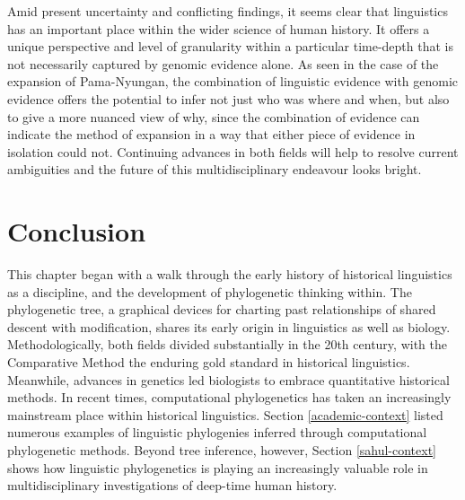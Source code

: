 Amid present uncertainty and conflicting findings, it seems clear that linguistics has an important place within the wider science of human history. It offers a unique perspective and level of granularity within a particular time-depth that is not necessarily captured by genomic evidence alone. As seen in the case of the expansion of Pama-Nyungan, the combination of linguistic evidence with genomic evidence offers the potential to infer not just who was where and when, but also to give a more nuanced view of why, since the combination of evidence can indicate the method of expansion in a way that either piece of evidence in isolation could not. Continuing advances in both fields will help to resolve current ambiguities and the future of this multidisciplinary endeavour looks bright.

\hypertarget{lit-rev-conclusion}{%
\section{Conclusion}\label{lit-rev-conclusion}}

This chapter began with a walk through the early history of historical linguistics as a discipline, and the development of phylogenetic thinking within. The phylogenetic tree, a graphical devices for charting past relationships of shared descent with modification, shares its early origin in linguistics as well as biology. Methodologically, both fields divided substantially in the 20th century, with the Comparative Method the enduring gold standard in historical linguistics. Meanwhile, advances in genetics led biologists to embrace quantitative historical methods. In recent times, computational phylogenetics has taken an increasingly mainstream place within historical linguistics. Section \ref{academic-context} listed numerous examples of linguistic phylogenies inferred through computational phylogenetic methods. Beyond tree inference, however, Section \ref{sahul-context} shows how linguistic phylogenetics is playing an increasingly valuable role in multidisciplinary investigations of deep-time human history.

